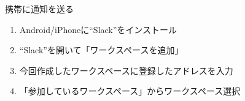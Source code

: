 \documentclass[dvipdfmx,xcolor={svgnames},aspectratio=169]{beamer}
\begin{document}
  \begin{frame}{携帯に通知を送る}
    \begin{enumerate}\setlength{\itemsep}{15pt}
      \item Android/iPhoneに``Slack''をインストール
      \item ``Slack''を開いて「ワークスペースを追加」
      \item 今回作成したワークスペースに登録したアドレスを入力
      \item 「参加しているワークスペース」からワークスペース選択
    \end{enumerate}
  \end{frame}
\end{document}

